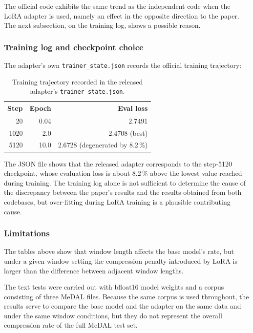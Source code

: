 \documentclass[12pt,a4paper]{article}
\begin{document}
The official code exhibits the same trend as the independent code when the LoRA adapter is
used, namely an effect in the opposite direction to the paper. The next subsection, on the
training log, shows a possible reason.

\subsubsection{Training log and checkpoint choice}

The adapter's own \texttt{trainer\_state.json} records the official training trajectory:

\begin{table}[htbp]\centering\small
\caption{Training trajectory recorded in the released adapter's \texttt{trainer\_state.json}.}
\begin{tabular}{@{}rrr@{}}
\toprule
Step & Epoch & Eval loss \\
\midrule
20 & 0.04 & 2.7491 \\
1020 & 2.0 & 2.4708 (best) \\
5120 & 10.0 & 2.6728 (degenerated by 8.2\,\%) \\
\bottomrule
\end{tabular}
\end{table}

The JSON file shows that the released adapter corresponds to the step-5120 checkpoint, whose
evaluation loss is about 8.2\,\% above the lowest value reached during training. The training
log alone is not sufficient to determine the cause of the discrepancy between the paper's
results and the results obtained from both codebases, but over-fitting during LoRA training is
a plausible contributing cause.

\subsubsection{Limitations}

The tables above show that window length affects the base model's rate, but under a given
window setting the compression penalty introduced by LoRA is larger than the difference
between adjacent window lengths.

The text tests were carried out with bfloat16 model weights and a corpus consisting of three
MeDAL files. Because the same corpus is used throughout, the results serve to compare the base
model and the adapter on the same data and under the same window conditions, but they do not
represent the overall compression rate of the full MeDAL test set.
\end{document}
